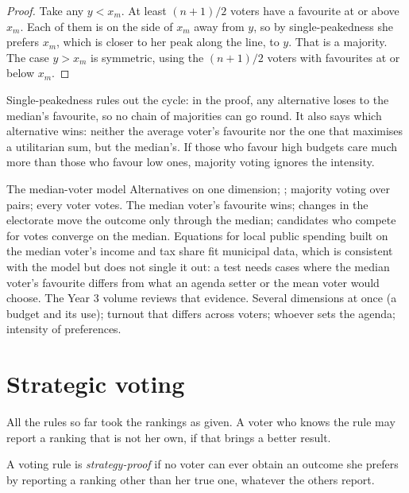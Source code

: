 \begin{proof}
Take any $y < x_m$. At least $(n + 1)/2$ voters have a favourite at or above $x_m$. Each of them is on the
side of $x_m$ away from $y$, so by single-peakedness she prefers $x_m$, which is closer to her peak along the
line, to $y$. That is a majority. The case $y > x_m$ is symmetric, using the $(n + 1)/2$ voters with favourites
at or below $x_m$.
\end{proof}

Single-peakedness rules out the cycle: in the proof, any alternative loses to the median's favourite, so
no chain of majorities can go round. It also says which alternative wins: neither the average voter's
favourite nor the one that maximises a utilitarian sum, but the median's. If those who favour high budgets
care much more than those who favour low ones, majority voting ignores the intensity.

\begin{model}{The median-voter model}
\assumes Alternatives on one dimension; ; majority voting over pairs; every
voter votes.
\predicts The median voter's favourite wins; changes in the electorate move the outcome only through the
median; candidates who compete for votes converge on the median.
\tested Equations for local public spending built on the median voter's income and tax share fit municipal
data, which is consistent with the model but does not single it out: a test needs cases where the median
voter's favourite differs from what an agenda setter or the mean voter would choose. The Year 3 volume
reviews that evidence.
\breaks Several dimensions at once (a budget and its use); turnout that differs across voters; whoever
sets the agenda; intensity of preferences.
\end{model}

\section{Strategic voting}\label{sec:b2:social-choice:strategic}

All the rules so far took the rankings as given. A voter who knows the rule may report a ranking that is not
her own, if that brings a better result.

\begin{definition}\label{def:b2:social-choice:strategy-proof}
A voting rule is \emph{strategy-proof} if no voter can ever obtain an
outcome she prefers by reporting a ranking other than her true one, whatever the others report.
\end{definition}

